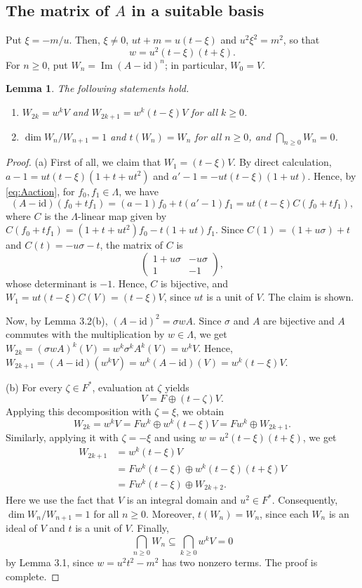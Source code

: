 \documentclass[11pt,reqno,a4paper]{amsart}
\numberwithin{equation}{section}
\newtheorem{lemma}[theorem]{Lemma}
\theoremstyle{definition}
\theoremstyle{plain}
\newcommand{\Imop}{\operatorname{Im}}
\newcommand{\id}{\mathrm{id}}
\begin{document}
\subsection{The matrix of \texorpdfstring{$A$}{A} in a suitable basis}
Put $\xi=-m/u$. Then, $\xi\ne0$, $ut+m=u(t-\xi)$ and $u^2\xi^2=m^2$, so that
\[
w=u^2(t-\xi)(t+\xi).
\]
For $n\ge0$, put $W_n=\Imop(A-\id)^n$; in particular, $W_0=V$.

\begin{lemma}
The following statements hold.
\begin{enumerate}
\item[(a)] $W_{2k}=w^kV$ and $W_{2k+1}=w^k(t-\xi)V$ for all $k\ge0$.
\item[(b)] $\dim W_n/W_{n+1}=1$ and $t(W_n)=W_n$ for all $n\ge0$, and $\bigcap_{n\ge0}W_n=0$.
\end{enumerate}
\end{lemma}
\begin{proof}
(a) First of all, we claim that $W_1=(t-\xi)V$. By direct calculation,
$a-1=ut(t-\xi)(1+t+ut^2)$ and $a'-1=-ut(t-\xi)(1+ut)$. Hence, by \eqref{eq:Aaction}, for $f_0,f_1\in\Lambda$, we have
\[
(A-\id)(f_0+tf_1)=(a-1)f_0+t(a'-1)f_1=ut(t-\xi)C(f_0+tf_1),
\]
where $C$ is the $\Lambda$-linear map given by $C(f_0+tf_1)=(1+t+ut^2)f_0-t(1+ut)f_1$. Since $C(1)=(1+u\sigma)+t$ and $C(t)=-u\sigma-t$, the matrix of $C$ is
\[
\begin{pmatrix}1+u\sigma&-u\sigma\\1&-1\end{pmatrix},
\]
whose determinant is $-1$. Hence, $C$ is bijective, and $W_1=ut(t-\xi)C(V)=(t-\xi)V$, since $ut$ is a unit of $V$. The claim is shown.

Now, by Lemma 3.2(b), $(A-\id)^2=\sigma wA$. Since $\sigma$ and $A$ are bijective and $A$ commutes with the multiplication by $w\in\Lambda$, we get $W_{2k}=(\sigma wA)^k(V)=w^k\sigma^k A^k(V)=w^kV$. Hence, $W_{2k+1}=(A-\id)(w^kV)=w^k(A-\id)(V)=w^k(t-\xi)V$.

(b) For every $\zeta\in F^*$, evaluation at $\zeta$ yields
\[
V=F\oplus(t-\zeta)V.
\]
Applying this decomposition with $\zeta=\xi$, we obtain
\[
W_{2k}=w^kV=Fw^k\oplus w^k(t-\xi)V=Fw^k\oplus W_{2k+1}.
\]
Similarly, applying it with $\zeta=-\xi$ and using $w=u^2(t-\xi)(t+\xi)$, we get
\[
\begin{aligned}
W_{2k+1}&=w^k(t-\xi)V\\
&=Fw^k(t-\xi)\oplus w^k(t-\xi)(t+\xi)V\\
&=Fw^k(t-\xi)\oplus W_{2k+2}.
\end{aligned}
\]
Here we use the fact that $V$ is an integral domain and $u^2\in F^*$. Consequently, $\dim W_n/W_{n+1}=1$ for all $n\ge0$. Moreover, $t(W_n)=W_n$, since each $W_n$ is an ideal of $V$ and $t$ is a unit of $V$. Finally,
\[
\bigcap_{n\ge0}W_n\subseteq\bigcap_{k\ge0}w^kV=0
\]
by Lemma 3.1, since $w=u^2t^2-m^2$ has two nonzero terms. The proof is complete.
\end{proof}
\end{document}

